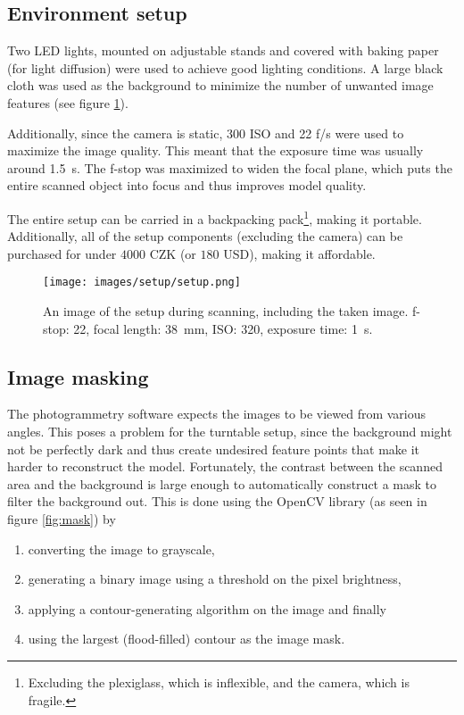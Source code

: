 \subsection{Environment setup}
Two LED lights, mounted on adjustable stands and covered with baking paper (for light diffusion) were used to achieve good lighting conditions.
A large black cloth was used as the background to minimize the number of unwanted image features (see figure \ref{fig:setup}).

Additionally, since the camera is static, 300 ISO and 22 f/s were used to maximize the image quality.
This meant that the exposure time was usually around \SI{1.5}{\second}.
The f-stop was maximized to widen the focal plane, which puts the entire scanned object into focus and thus improves model quality.

The entire setup can be carried in a backpacking pack\footnote{Excluding the plexiglass, which is inflexible, and the camera, which is fragile.}, making it portable.
Additionally, all of the setup components (excluding the camera) can be purchased for under $4000$ CZK (or $180$ USD), making it affordable.

\begin{figure}
	\centering
	\texttt{[image: images/setup/setup.png]}
	\caption{An image of the setup during scanning, including the taken image. f-stop: 22, focal length: \SI{38}{\milli\meter}, ISO: 320, exposure time: \SI{1}{\second}.}
	\label{fig:setup}
\end{figure}

\subsection{Image masking}
The photogrammetry software expects the images to be viewed from various angles.
This poses a problem for the turntable setup, since the background might not be perfectly dark and thus create undesired feature points that make it harder to reconstruct the model.
Fortunately, the contrast between the scanned area and the background is large enough to automatically construct a mask to filter the background out.
This is done using the OpenCV library (as seen in figure \ref{fig:mask}) by
\begin{enumerate}
	\item converting the image to grayscale,
	\item generating a binary image using a threshold on the pixel brightness,
	\item applying a contour-generating algorithm \cite{suzuki1985topological} on the image and finally
	\item using the largest (flood-filled) contour as the image mask.
\end{enumerate}

